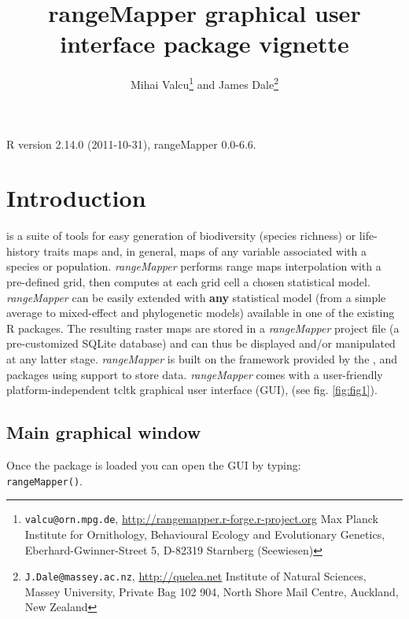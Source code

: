 \documentclass[ a4paper ]{article}
\begin{document}
\title{rangeMapper graphical user interface package vignette}
\author{
Mihai Valcu\footnote{
	\texttt{valcu@orn.mpg.de},
	\url{http://rangemapper.r-forge.r-project.org}
	Max Planck Institute for Ornithology, 
	Behavioural Ecology and Evolutionary Genetics, 
	Eberhard-Gwinner-Street 5, D-82319 Starnberg (Seewiesen)} and 
James Dale\footnote{
	\texttt{J.Dale@massey.ac.nz},
	\url{http://quelea.net}
	Institute of Natural Sciences,
	Massey University,
	Private Bag 102 904,
	North Shore Mail Centre,
	Auckland, New Zealand 
}
}

\maketitle
R version 2.14.0 (2011-10-31),
rangeMapper 0.0-6.6.


\section{Introduction}
	\cite{rangeMapper} is a suite of tools for easy generation of biodiversity (species richness) or life-history traits maps and, in general, maps of any variable associated with a species or population. 
	\emph{rangeMapper} performs range maps interpolation with a pre-defined grid, then computes at each grid cell a chosen statistical model. 
	\emph{rangeMapper} can be easily extended with {\bf any} statistical model (from a simple average to mixed-effect and phylogenetic models) available in one of the existing R packages.
	 The resulting raster maps are stored in a \emph{rangeMapper} project file (a pre-customized SQLite database) and 
	 can thus be displayed and/or manipulated at any latter stage.
	\emph{rangeMapper} is built on the framework provided by the \cite{sp}, \cite{maptools} and \cite{rgdal} packages using \cite{sqlite} support to store data.
	\emph{rangeMapper} comes with a user-friendly platform-independent tcltk graphical user interface (GUI), (see fig. \ref{fig:fig1}). 

\subsection{Main graphical window}
Once the package is loaded you can open the GUI by typing:\\
\texttt{rangeMapper()}.
\end{document}
